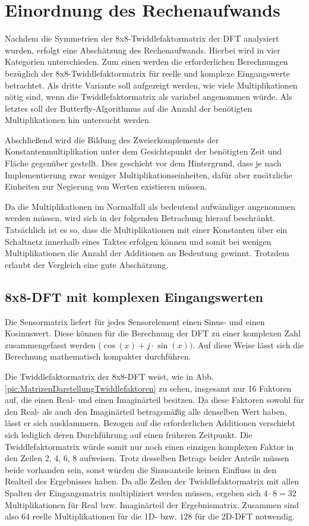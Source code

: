 \section{Einordnung des Rechenaufwands}\label{sec:abschaetzung_Rechenaufwand}
Nachdem die Symmetrien der 8x8-Twiddlefaktormatrix der DFT analysiert wurden, erfolgt eine Abschätzung des Rechenaufwands.
Hierbei wird in vier Kategorien unterschieden. Zum einen werden die erforderlichen Berechnungen bezüglich der 8x8-Twiddlefaktormatrix für reelle
und komplexe Eingangswerte betrachtet. Als dritte Variante soll aufgezeigt werden, wie viele Multiplikationen nötig sind, wenn die 
Twiddlefaktormatrix als variabel angenommen würde. Als letztes soll der Butterfly-Algorithmus auf die Anzahl der benötigten Multiplikationen
hin untersucht werden.

Abschließend wird die Bildung des Zweierkomplements der Konstantenmultiplikation unter dem Gesichtspunkt der benötigten Zeit und Fläche gegenüber gestellt.
Dies geschieht vor dem Hintergrund, dass je nach Implementierung zwar weniger Multiplikationseinheiten, dafür aber zusätzliche Einheiten zur Negierung von Werten existieren müssen.

Da die Multiplikationen im Normalfall als bedeutend aufwändiger angenommen werden müssen, wird sich in der folgenden Betrachung hierauf beschränkt. Tatsächlich ist es so,
dass die Multiplikationen mit einer Konstanten über ein Schaltnetz innerhalb eines Taktes erfolgen können und somit bei wenigen Multiplikationen die Anzahl der Additionen
an Bedeutung gewinnt. Trotzdem erlaubt der Vergleich eine gute Abschätzung.

\subsection{8x8-DFT mit komplexen Eingangswerten}\label{sec:KomplexeEingangswerte}
Die Sensormatrix liefert für jedes Sensorelement einen Sinus- und einen Kosinuswert. Diese können für die Berechnung der DFT zu einer komplexen Zahl zusammengefasst werden
($\cos(x)+j\cdot \sin(x))$. Auf diese Weise lässt sich die Berechnung mathematisch kompakter durchführen.

Die Twiddlefaktormatrix der 8x8-DFT weist, wie in Abb. \ref{pic:MatrizenDarstellungTwiddlefaktoren} zu sehen, insgesamt nur 16 Faktoren auf, die einen Real- und einen Imaginärteil 
besitzen. Da diese Faktoren sowohl für den Real- als auch den Imaginärteil betragsmäßig alle denselben Wert haben, lässt er sich ausklammern. Bezogen auf die erforderlichen 
Additionen verschiebt sich lediglich deren Durchführung auf einen früheren Zeitpunkt. Die Twiddlefaktormatrix 
würde somit nur noch einen einzigen 
komplexen Faktor in den Zeilen 2, 4, 6, 8 aufweisen. Trotz desselben Betrags beider Anteile müssen beide vorhanden sein, sonst würden die Sinusanteile keinen Einfluss in
den Realteil des Ergebnisses haben. Da alle Zeilen der Twiddlefaktormatrix mit allen Spalten der Eingangsmatrix multipliziert werden müssen, ergeben sich $4\cdot8=32$ 
Multiplikationen für Real bzw. Imaginärteil der Ergebnismatrix. Zusammen sind also $64$ reelle Multiplikationen für die 1D- bzw. $128$ für die 2D-DFT notwendig.


